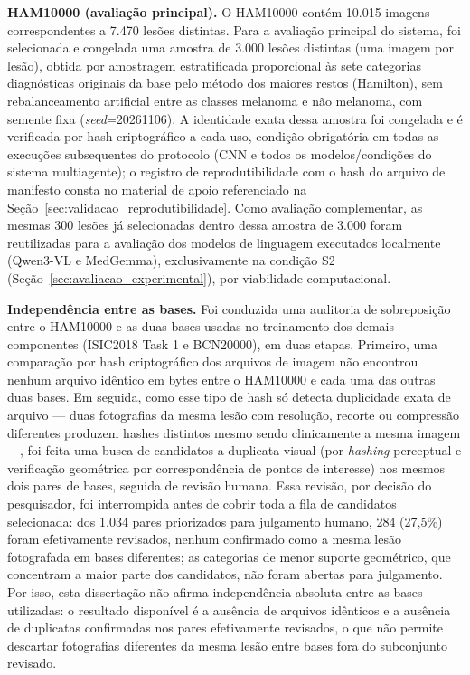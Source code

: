 \textbf{HAM10000 (avaliação principal).} O HAM10000 contém 10.015 imagens correspondentes a 7.470 lesões distintas. Para a avaliação principal do sistema, foi selecionada e congelada uma amostra de 3.000 lesões distintas (uma imagem por lesão), obtida por amostragem estratificada proporcional às sete categorias diagnósticas originais da base pelo método dos maiores restos (Hamilton), sem rebalanceamento artificial entre as classes melanoma e não melanoma, com semente fixa (\textit{seed}=20261106). A identidade exata dessa amostra foi congelada e é verificada por hash criptográfico a cada uso, condição obrigatória em todas as execuções subsequentes do protocolo (CNN e todos os modelos/condições do sistema multiagente); o registro de reprodutibilidade com o hash do arquivo de manifesto consta no material de apoio referenciado na Seção~\ref{sec:validacao_reprodutibilidade}. Como avaliação complementar, as mesmas 300 lesões já selecionadas dentro dessa amostra de 3.000 foram reutilizadas para a avaliação dos modelos de linguagem executados localmente (Qwen3-VL e MedGemma), exclusivamente na condição S2 (Seção~\ref{sec:avaliacao_experimental}), por viabilidade computacional.

\textbf{Independência entre as bases.} Foi conduzida uma auditoria de sobreposição entre o HAM10000 e as duas bases usadas no treinamento dos demais componentes (ISIC2018 Task 1 e BCN20000), em duas etapas. Primeiro, uma comparação por hash criptográfico dos arquivos de imagem não encontrou nenhum arquivo idêntico em bytes entre o HAM10000 e cada uma das outras duas bases. Em seguida, como esse tipo de hash só detecta duplicidade exata de arquivo — duas fotografias da mesma lesão com resolução, recorte ou compressão diferentes produzem hashes distintos mesmo sendo clinicamente a mesma imagem —, foi feita uma busca de candidatos a duplicata visual (por \textit{hashing} perceptual e verificação geométrica por correspondência de pontos de interesse) nos mesmos dois pares de bases, seguida de revisão humana. Essa revisão, por decisão do pesquisador, foi interrompida antes de cobrir toda a fila de candidatos selecionada: dos 1.034 pares priorizados para julgamento humano, 284 (27,5\%) foram efetivamente revisados, nenhum confirmado como a mesma lesão fotografada em bases diferentes; as categorias de menor suporte geométrico, que concentram a maior parte dos candidatos, não foram abertas para julgamento. Por isso, esta dissertação não afirma independência absoluta entre as bases utilizadas: o resultado disponível é a ausência de arquivos idênticos e a ausência de duplicatas confirmadas nos pares efetivamente revisados, o que não permite descartar fotografias diferentes da mesma lesão entre bases fora do subconjunto revisado.

